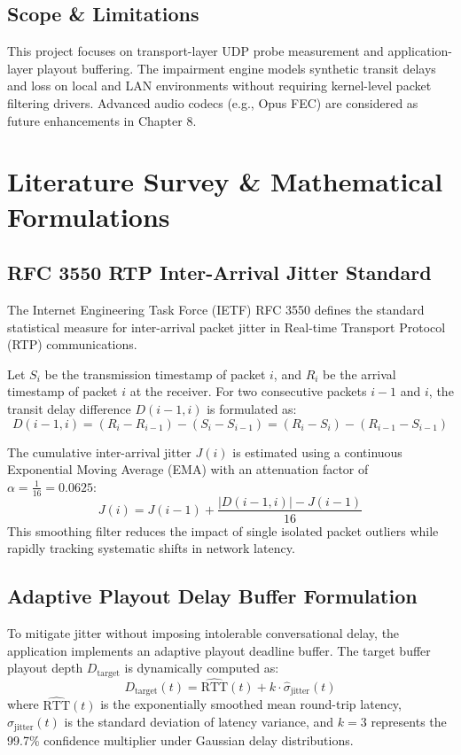 \documentclass[12pt, a4paper]{report}
\begin{document}
\section{Scope \& Limitations}
This project focuses on transport-layer UDP probe measurement and application-layer playout buffering. The impairment engine models synthetic transit delays and loss on local and LAN environments without requiring kernel-level packet filtering drivers. Advanced audio codecs (e.g., Opus FEC) are considered as future enhancements in Chapter 8.

\newpage
\chapter{Literature Survey \& Mathematical Formulations}

\section{RFC 3550 RTP Inter-Arrival Jitter Standard}
The Internet Engineering Task Force (IETF) RFC 3550 defines the standard statistical measure for inter-arrival packet jitter in Real-time Transport Protocol (RTP) communications.

Let $S_i$ be the transmission timestamp of packet $i$, and $R_i$ be the arrival timestamp of packet $i$ at the receiver. For two consecutive packets $i-1$ and $i$, the transit delay difference $D(i-1, i)$ is formulated as:
\begin{equation}
D(i-1, i) = (R_i - R_{i-1}) - (S_i - S_{i-1}) = (R_i - S_i) - (R_{i-1} - S_{i-1})
\end{equation}

The cumulative inter-arrival jitter $J(i)$ is estimated using a continuous Exponential Moving Average (EMA) with an attenuation factor of $\alpha = \frac{1}{16} = 0.0625$:
\begin{equation}
J(i) = J(i-1) + \frac{|D(i-1, i)| - J(i-1)}{16}
\end{equation}
This smoothing filter reduces the impact of single isolated packet outliers while rapidly tracking systematic shifts in network latency.

\section{Adaptive Playout Delay Buffer Formulation}
To mitigate jitter without imposing intolerable conversational delay, the application implements an adaptive playout deadline buffer. The target buffer playout depth $D_{\text{target}}$ is dynamically computed as:
\begin{equation}
D_{\text{target}}(t) = \widehat{\text{RTT}}(t) + k \cdot \widehat{\sigma}_{\text{jitter}}(t)
\end{equation}
where $\widehat{\text{RTT}}(t)$ is the exponentially smoothed mean round-trip latency, $\widehat{\sigma}_{\text{jitter}}(t)$ is the standard deviation of latency variance, and $k = 3$ represents the 99.7\% confidence multiplier under Gaussian delay distributions.
\end{document}
